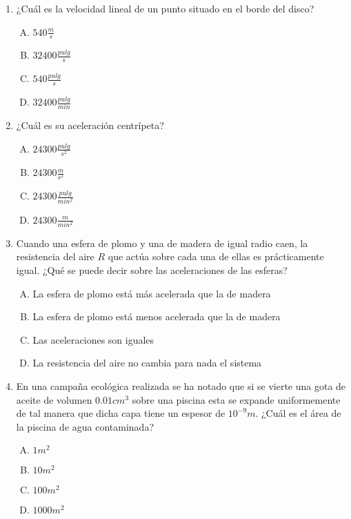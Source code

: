 \begin{enumerate}
\newpage
\item ¿Cuál es la velocidad lineal de un punto situado en el borde del disco? \label{dia-8}

\begin{enumerate}[(A)]
\item $540\frac{m}{s}$
\item $32400\frac{pulg}{s}$
\item $540\frac{pulg}{s}$
\item $32400\frac{pulg}{min}$
\end{enumerate}


\item ¿Cuál es su aceleración centrípeta?\label{dia-9}

\begin{enumerate}[(A)]
\item $24300\frac{pulg}{s^2}$
\item $24300\frac{m}{s^2}$
\item $24300\frac{pulg}{min^2}$
\item $24300\frac{m}{min^2}$
\end{enumerate}

\item Cuando una esfera de plomo y una de madera de igual radio caen, la resistencia del aire $R$ que actúa sobre cada una de ellas es prácticamente igual. ¿Qu\'e se puede decir sobre las aceleraciones de las esferas?\label{dia-10}

\begin{enumerate}[(A)]
\item La esfera de plomo está más acelerada que la de madera
\item La esfera de plomo está menos acelerada que la de madera
\item Las aceleraciones son iguales
\item La resistencia del aire no cambia para nada el sistema
\end{enumerate}

\item En una campaña ecológica realizada se ha notado que si se vierte una gota de aceite de volumen $0.01cm^3$ sobre una piscina esta se expande uniformemente de tal manera que dicha capa tiene un espesor de $10^{-9}m$. ¿Cuál es el área de la piscina de agua contaminada?\label{dia-11}

\begin{enumerate}[(A)]
\item $1m^2$
\item $10m^2$
\item $100m^2$
\item $1000m^2$
\end{enumerate}


\end{enumerate}
